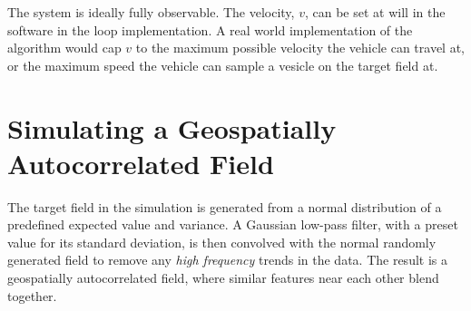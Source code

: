 The system is ideally fully observable. The velocity, $v$, can be set at will in the software in the loop implementation. A real world implementation of the algorithm would cap $v$ to the maximum possible velocity the vehicle can travel at, or the maximum speed the vehicle can sample a vesicle on the target field at.

\section{Simulating a Geospatially Autocorrelated Field}
The target field in the simulation is generated from a normal distribution of a predefined expected value and variance. A Gaussian low-pass filter, with a preset value for its standard deviation, is then convolved with the normal randomly generated field to remove any \textit{high frequency} trends in the data. The result is a geospatially autocorrelated field, where similar features near each other blend together.
